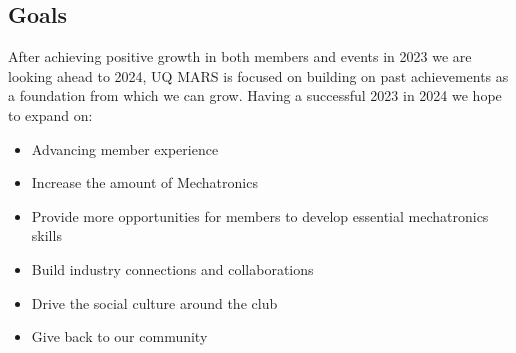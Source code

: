 \documentclass[a4paper,12pt]{report}
\begin{document}
\subsection*{Goals}
After achieving positive growth in both members and events in 2023 we are looking ahead to 2024, UQ MARS is focused on building on past achievements as a foundation from which we can grow. Having a successful 2023 in 2024 we hope to expand on:
\begin{itemize}
    \item Advancing member experience
    \item Increase the amount of Mechatronics 
    \item Provide more opportunities for members to develop essential mechatronics skills
    \item Build industry connections and collaborations
    \item Drive the social culture around the club
    \item Give back to our community
\end{itemize}
\end{document}
